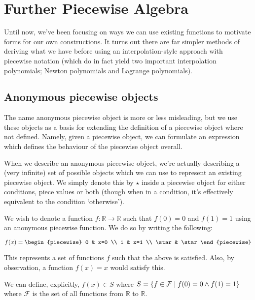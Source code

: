 \section{Further Piecewise Algebra}
Until now, we've been focusing on ways we can use existing functions to motivate forms for our own constructions. It turns out there are far simpler methods of deriving what we have before using an interpolation-style approach with piecewise notation (which do in fact yield two important interpolation polynomials; Newton polynomials and Lagrange polynomials).

\subsection{Anonymous piecewise objects}
The name anonymous piecewise object is more or less misleading, but we use these objects as a basis for extending the definition of a piecewise object where not defined. Namely, given a piecewise object, we can formulate an expression which defines the behaviour of the piecewise object overall.

When we describe an anonymous piecewise object, we're actually describing a (very infinite) set of possible objects which we can use to represent an existing piecewise object. We simply denote this by $\star$ inside a piecewise object for either conditions, piece values or both (though when in a condition, it's effectively equivalent to the condition `otherwise').

\begin{example}
    \label{example:anonymous_piecewise_1}
    We wish to denote a function $f:\mathbb{R}\to\mathbb{R}$ such that $f(0)=0$ and $f(1)=1$ using an anonymous piecewise function. We do so by writing the following:

    $$
        f(x) = \begin{piecewise}
            0 & x=0 \\
            1 & x=1 \\
            \star & \star
        \end{piecewise}
    $$

    This represents a set of functions $f$ such that the above is satisfied. Also, by observation, a function $f(x)=x$ would satisfy this.

    We can define, explicitly, $f(x)\in S$ where $S=\br*{f\in \mathcal{F}\mid f(0)=0\land f(1)=1}$ where $\mathcal{F}$ is the set of all functions from $\mathbb{R}$ to $\mathbb{R}$.

\end{example}

